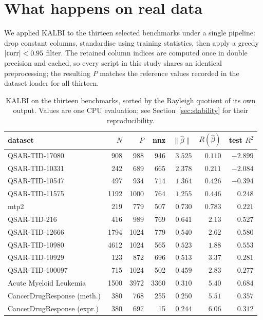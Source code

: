 \documentclass[11pt]{article}
\newcommand{\bhat}{\hat{\beta}}
\begin{document}
\section{What happens on real data}
\label{sec:real}

We applied KALBI to the thirteen selected benchmarks under a single
pipeline: drop constant columns, standardise using training statistics,
then apply a greedy $|{\rm corr}| < 0.95$ filter. The retained column
indices are computed once in double precision and cached, so every script
in this study shares an identical preprocessing; the resulting $P$ matches
the reference values recorded in the dataset loader for all thirteen.

\begin{table}[h]
\centering
\caption{KALBI on the thirteen benchmarks, sorted by the Rayleigh quotient
of its own output. Values are one CPU evaluation; see
Section~\ref{sec:stability} for their reproducibility.}
\label{tab:real13}
\begin{tabular}{@{}lrrrrrr@{}}
\toprule
dataset & $N$ & $P$ & nnz & $\|\bhat\|$ & $R(\bhat)$ & test $R^2$ \\
\midrule
QSAR-TID-17080 &  908 &  988 &  946 & $3.525$ & $0.110$ & $-2.899$ \\
QSAR-TID-10331 &  242 &  689 &  665 & $2.378$ & $0.211$ & $-2.084$ \\
QSAR-TID-10547 &  497 &  934 &  714 & $1.364$ & $0.426$ & $-0.394$ \\
QSAR-TID-11575 & 1192 & 1000 &  764 & $1.255$ & $0.446$ & $\phantom{-}0.248$ \\
mtp2           &  219 &  779 &  507 & $0.730$ & $0.783$ & $\phantom{-}0.221$ \\
\midrule
QSAR-TID-216   &  416 &  989 &  769 & $0.641$ & $2.13$ & $\phantom{-}0.527$ \\
QSAR-TID-12666 & 1794 & 1024 &  779 & $0.540$ & $2.62$ & $\phantom{-}0.580$ \\
QSAR-TID-10980 & 4612 & 1024 &  565 & $0.523$ & $1.88$ & $\phantom{-}0.553$ \\
QSAR-TID-10929 &  123 &  872 &  696 & $0.513$ & $3.37$ & $\phantom{-}0.281$ \\
QSAR-TID-100097 & 715 & 1024 &  502 & $0.459$ & $2.83$ & $\phantom{-}0.277$ \\
Acute Myeloid Leukemia & 1500 & 3972 & 3360 & $0.310$ & $5.40$ & $\phantom{-}0.684$ \\
CancerDrugResponse (meth.) & 380 & 768 & 255 & $0.250$ & $5.51$ & $\phantom{-}0.357$ \\
CancerDrugResponse (expr.) & 380 & 697 &  15 & $0.244$ & $6.06$ & $\phantom{-}0.312$ \\
\bottomrule
\end{tabular}
\end{table}
\end{document}
